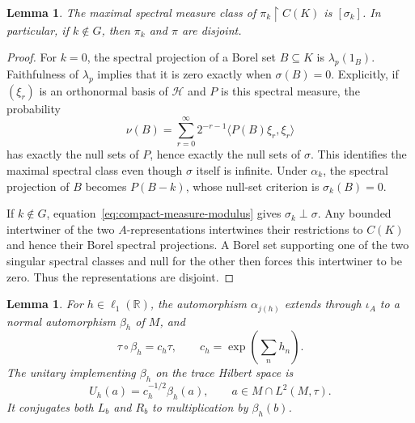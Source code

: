 \documentclass[11pt]{article}
\newtheorem{lemma}[theorem]{Lemma}
\theoremstyle{definition}
\newcommand{\R}{\mathbb R}
\begin{document}
\begin{lemma}
\label{lem:diagonal-spectral-class}
The maximal spectral measure class of
$\pi_k\mathbin{\upharpoonright}C(K)$ is $[\sigma_k]$.
In particular, if $k\notin G$, then $\pi_k$ and $\pi$ are disjoint.
\end{lemma}

\begin{proof}
For $k=0$, the spectral projection of a Borel set $B\subseteq K$ is
$\lambda_p(1_B)$. Faithfulness of $\lambda_p$ implies that it is zero
exactly when $\sigma(B)=0$. Explicitly, if $(\xi_r)$ is an orthonormal
basis of $\mathcal H$ and $P$ is this spectral measure, the probability
\[
 \nu(B)=\sum_{r=0}^{\infty}2^{-r-1}\langle P(B)\xi_r,\xi_r\rangle
\]
has exactly the null sets of $P$, hence exactly the null sets of $\sigma$.
This identifies the maximal spectral class even though $\sigma$ itself
is infinite. Under $\alpha_k$, the spectral projection of $B$ becomes
$P(B-k)$, whose null-set criterion is $\sigma_k(B)=0$.

If $k\notin G$, equation~\eqref{eq:compact-measure-modulus} gives
$\sigma_k\perp\sigma$. Any bounded intertwiner of the two
$A$-representations intertwines their restrictions to $C(K)$ and hence
their Borel spectral projections. A Borel set supporting one of the
two singular spectral classes and null for the other then forces this
intertwiner to be zero. Thus the representations are disjoint.
\end{proof}

\begin{lemma}
\label{lem:normal-trace-modulus}
For $h\in\ell_1(\R)$, the automorphism $\alpha_{j(h)}$ extends through
$\iota_A$ to a normal automorphism $\beta_h$ of $M$, and
\begin{equation}
 \tau\circ\beta_h=c_h\tau,
 \qquad c_h=\exp\!\left(\sum_n h_n\right).
 \label{eq:trace-scaling}
\end{equation}
The unitary implementing $\beta_h$ on the trace Hilbert space is
\begin{equation}
 U_h(a)=c_h^{-1/2}\beta_h(a),
 \qquad a\in M\cap L^2(M,\tau).
 \label{eq:explicit-standard-unitary}
\end{equation}
It conjugates both $L_b$ and $R_b$ to multiplication by $\beta_h(b)$.
\end{lemma}
\end{document}
